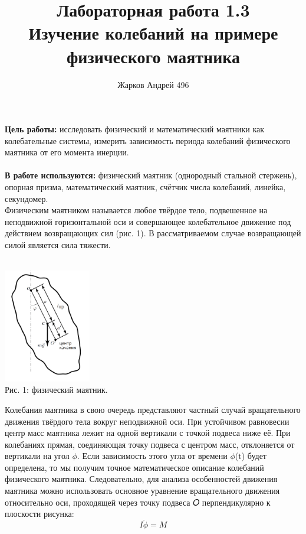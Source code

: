\documentclass[12pt]{article}
\begin{document}
    \author {Жарков Андрей 496}
    \title {Лабораторная работа 1.3 \\  Изучение колебаний на примере физического маятника}
    \maketitle{}   

    \indent
    \textbf{Цель работы:} исследовать физический и математический маятники
    как колебательные системы, измерить зависимость периода колебаний физического маятника от его момента инерции.
    \\ \\
    \indent
    \textbf{В работе используются:} физический маятник (однородный стальной стержень), опорная призма, математический маятник, счётчик числа колебаний, линейка, секундомер.
    \\
    Физическим маятником называется любое твёрдое тело, подвешенное на неподвижной горизонтальной оси и совершающее колебательное движение под действием возвращающих сил (рис. 1). В рассматриваемом случае возвращающей силой является сила тяжести. \\ \\
    
    \begin{center} 
    	\includegraphics[width=1.5in]{phys_mtn.png} \\ Рис. 1: физический маятник.
    \end{center}
    
    Колебания маятника в свою очередь представляют частный случай вращательного
    движения твёрдого тела вокруг неподвижной оси. При устойчивом равновесии центр масс маятника лежит на одной вертикали с точкой подвеса ниже её. При колебаниях прямая, соединяющая точку подвеса с центром масс,
    отклоняется от вертикали на угол $\phi$. Если зависимость этого угла от времени $\phi$(t) будет
    определена, то мы получим точное математическое описание колебаний физического маятника. Следовательно, для
    анализа особенностей движения маятника можно использовать основное уравнение вращательного движения относительно оси, проходящей
    через точку подвеса 𝑂 перпендикулярно к плоскости рисунка:
    \begin{equation}
       I \ddot \phi = M
    \end{equation}
	
\end{document}
